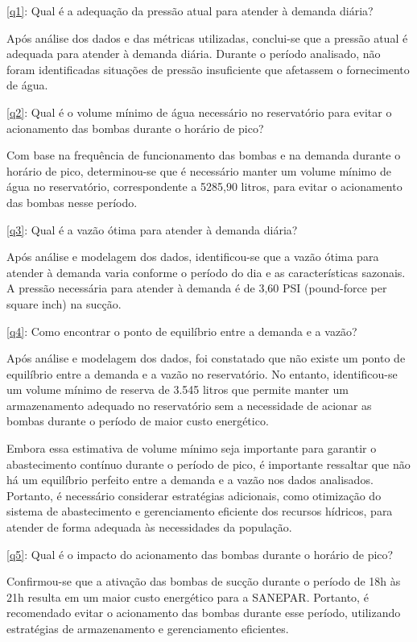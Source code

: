 \ref{q1}: Qual é a adequação da pressão atual para atender à demanda diária?

Após análise dos dados e das métricas utilizadas, conclui-se que a pressão atual é adequada para atender à demanda diária. Durante o período analisado, não foram identificadas situações de pressão insuficiente que afetassem o fornecimento de água.

\ref{q2}: Qual é o volume mínimo de água necessário no reservatório para evitar o acionamento das bombas durante o horário de pico?

Com base na frequência de funcionamento das bombas e na demanda durante o horário de pico, determinou-se que é necessário manter um volume mínimo de água no reservatório, correspondente a 5285,90 litros, para evitar o acionamento das bombas nesse período.

\ref{q3}: Qual é a vazão ótima para atender à demanda diária?

Após análise e modelagem dos dados, identificou-se que a vazão ótima para atender à demanda varia conforme o período do dia e as características sazonais. A pressão necessária para atender à demanda é de 3,60 PSI (pound-force per square inch) na sucção.

\ref{q4}: Como encontrar o ponto de equilíbrio entre a demanda e a vazão?

Após análise e modelagem dos dados, foi constatado que não existe um ponto de equilíbrio entre a demanda e a vazão no reservatório. No entanto, identificou-se um volume mínimo de reserva de 3.545 litros que permite manter um armazenamento adequado no reservatório sem a necessidade de acionar as bombas durante o período de maior custo energético.

Embora essa estimativa de volume mínimo seja importante para garantir o abastecimento contínuo durante o período de pico, é importante ressaltar que não há um equilíbrio perfeito entre a demanda e a vazão nos dados analisados. Portanto, é necessário considerar estratégias adicionais, como otimização do sistema de abastecimento e gerenciamento eficiente dos recursos hídricos, para atender de forma adequada às necessidades da população.

\ref{q5}: Qual é o impacto do acionamento das bombas durante o horário de pico?

Confirmou-se que a ativação das bombas de sucção durante o período de 18h às 21h resulta em um maior custo energético para a SANEPAR. Portanto, é recomendado evitar o acionamento das bombas durante esse período, utilizando estratégias de armazenamento e gerenciamento eficientes.

